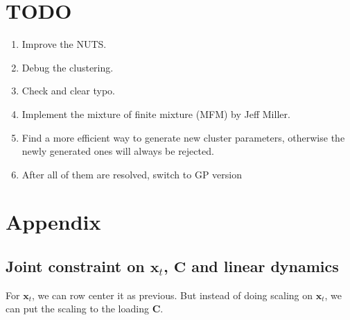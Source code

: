 \documentclass[]{article}
\begin{document}
\section{TODO}
\begin{enumerate}
	\def\labelenumi{(\arabic{enumi})}
	\item
	Improve the NUTS.
	\item
	Debug the clustering.
	\item
	Check and clear typo.
	\item
	Implement the mixture of finite mixture (MFM) by Jeff Miller.
	\item
	Find a more efficient way to generate new cluster parameters, otherwise the newly generated ones will always be rejected.
	\item
	After all of them are resolved, switch to GP version
	
\end{enumerate}


\clearpage
\section{Appendix}

\subsection{Joint constraint on $\mathbf{x}_t$, $\mathbf{C}$ and linear dynamics}
For $\mathbf{x}_t$, we can row center it as previous. But instead of doing scaling on $\bm{x}_t$, we can put the scaling to the loading $\mathbf{C}$.
\end{document}
